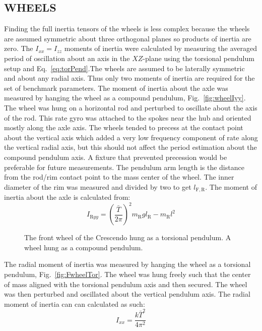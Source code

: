 \documentclass{bmd2010p}
\begin{document}
\subsection{WHEELS}
Finding the full inertia tensors of the wheels is less complex because the wheels
are assumed symmetric about three orthogonal planes so products of
inertia are zero. The $I_{xx}=I_{zz}$ moments of inertia were calculated by measuring
the averaged period of oscillation about an axis in the $XZ$-plane using the
torsional pendulum setup and Eq.~\ref{eq:torPend}.The wheels are assumed to be
laterally symmetric and about any radial axis. Thus only two
moments of inertia are required for the set of benchmark parameters. The moment
of inertia about the axle was measured by hanging the wheel as a compound
pendulum, Fig.~\ref{fig:wheelIyy}. The wheel was hung on a
horizontal rod and perturbed to oscillate about the axis of the rod. This rate
gyro was attached to the spokes near the hub and oriented mostly along the
axle axis. The wheels tended to precess at the contact point about the vertical
axis which added a very low frequency component of rate along the vertical
radial axis, but this should not affect the period estimation about the compound
pendulum axis. A fixture that prevented precession would be preferable for
future measurements. The pendulum arm length is the distance
from the rod/rim contact point to the mass center of the wheel. The inner
diameter of the rim was measured and divided by two to get $l_\mathrm{F,R}$. The moment of
inertia about the axle is calculated from:
\begin{equation}
    I_{\mathrm{R}yy} = \left(\frac{\bar{T}}{2\pi}\right)^2m_\mathrm{R}gl_\mathrm{R} -
    m_\mathrm{R}l^2
    \label{eq:CompoundInertia}
\end{equation}
\begin{figure}[tb]
    \centering
    \quad
    \caption{ The front wheel of the Crescendo hung as a
    torsional pendulum.  A wheel hung as a compound pendulum.}
    \label{fig:wheelPend}
\end{figure}
The radial moment of inertia was measured by hanging the wheel as a torsional
pendulum, Fig.~\ref{fig:FwheelTor}. The wheel was hung freely such that the center of mass aligned with
the torsional pendulum axis and then secured. The wheel was then
perturbed and oscillated about the vertical pendulum axis. The radial moment of inertia can can calculated as such:
\begin{equation}
    I_{xx} = \frac{k\bar{T}^2}{4\pi^2}
\end{equation}
\end{document}
